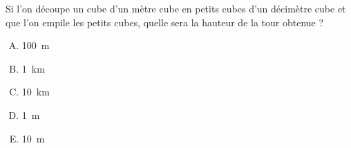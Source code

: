Si l'on découpe un cube d'un mètre cube en petits cubes d'un décimètre cube et que l'on
empile les petits cubes, quelle sera la hauteur de la tour obtenue ?
\begin{multicols}{5}
  \begin{enumerate}[A)]
  \item 100~m
  \item 1~km
  \item 10~km
  \item 1~m
  \item 10~m
  \end{enumerate}
\end{multicols}